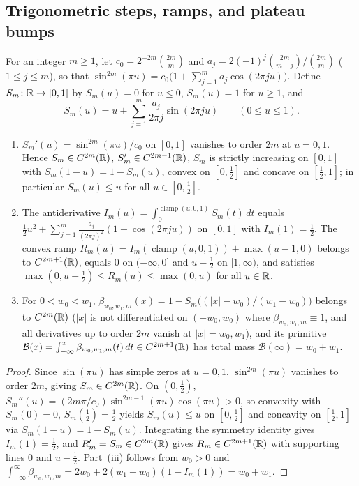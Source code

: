 \subsection{Trigonometric steps, ramps, and plateau bumps}\label{sec:prim-steps}

For an integer $m\ge1$, let $c_0=2^{-2m}\binom{2m}{m}$ and $a_j=2(-1)^j\binom{2m}{m-j}/\binom{2m}{m}$ ($1\le j\le m$),
so that $\sin^{2m}(\pi u)=c_0\bigl(1+\sum_{j=1}^m a_j\cos(2\pi ju)\bigr)$. Define $S_m\colon\mathbb{R}\to[0,1]$ by $S_m(u)=0$
for $u\le0$, $S_m(u)=1$ for $u\ge1$, and
\[
 S_m(u)=u+\sum_{j=1}^m\frac{a_j}{2\pi j}\sin(2\pi ju)\qquad(0\le u\le1).
\]

\begin{lemma}\label{lem:steps}
\begin{enumerate}[label=(\roman*)]
\item $S_m'(u)=\sin^{2m}(\pi u)/c_0$ on $[0,1]$ vanishes to order $2m$ at $u=0,1$. Hence $S_m\in C^{2m}(\mathbb{R})$,
$S_m'\in C^{2m-1}(\mathbb{R})$, $S_m$ is strictly increasing on $[0,1]$ with $S_m(1-u)=1-S_m(u)$, convex on $[0,\frac12]$ and
concave on $[\frac12,1]$; in particular $S_m(u)\le u$ for all $u\in[0,\frac12]$.
\item The antiderivative $I_m(u)=\int_0^{\operatorname{clamp}(u,0,1)}S_m(t)\,dt$ equals
$\frac12u^2+\sum_{j=1}^m\frac{a_j}{(2\pi j)^2}(1-\cos(2\pi ju))$ on $[0,1]$ with $I_m(1)=\frac12$. The convex ramp
$R_m(u)=I_m(\operatorname{clamp}(u,0,1))+\max(u-1,0)$ belongs to $C^{2m+1}(\mathbb{R})$, equals $0$ on $(-\infty,0]$ and
$u-\frac12$ on $[1,\infty)$, and satisfies $\max(0,u-\frac12)\le R_m(u)\le\max(0,u)$ for all $u\in\mathbb{R}$.
\item For $0<w_0<w_1$, $\beta_{w_0,w_1,m}(x)=1-S_m\bigl((|x|-w_0)/(w_1-w_0)\bigr)$ belongs to $C^{2m}(\mathbb{R})$ ($|x|$ is
not differentiated on $(-w_0,w_0)$ where $\beta_{w_0,w_1,m}\equiv1$, and all derivatives up to order $2m$ vanish at
$|x|=w_0,w_1$), and its primitive $\mathcal B(x)=\int_{-\infty}^x\beta_{w_0,w_1,m}(t)\,dt\in C^{2m+1}(\mathbb{R})$ has total mass
$\mathcal B(\infty)=w_0+w_1$.
\end{enumerate}
\end{lemma}

\begin{proof}
Since $\sin(\pi u)$ has simple zeros at $u=0,1$, $\sin^{2m}(\pi u)$ vanishes to order $2m$, giving $S_m\in C^{2m}(\mathbb{R})$.
On $(0,\frac12)$, $S_m''(u)=(2m\pi/c_0)\sin^{2m-1}(\pi u)\cos(\pi u)>0$, so convexity with $S_m(0)=0$, $S_m(\frac12)=\frac12$
yields $S_m(u)\le u$ on $[0,\frac12]$ and concavity on $[\frac12,1]$ via $S_m(1-u)=1-S_m(u)$. Integrating the symmetry
identity gives $I_m(1)=\frac12$, and $R_m'=S_m\in C^{2m}(\mathbb{R})$ gives $R_m\in C^{2m+1}(\mathbb{R})$ with supporting lines $0$ and
$u-\frac12$. Part~(iii) follows from $w_0>0$ and $\int_{-\infty}^\infty\beta_{w_0,w_1,m}=2w_0+2(w_1-w_0)(1-I_m(1))=w_0+w_1$.
\end{proof}

